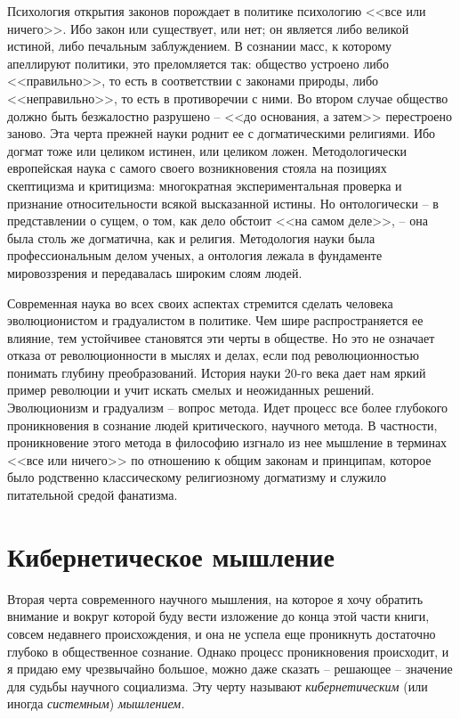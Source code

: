 \documentclass{book}
\begin{document}
Психология открытия законов порождает в политике психологию <<все или ничего>>. Ибо закон или существует, или нет; он является либо великой истиной, либо печальным заблуждением. В сознании масс, к которому апеллируют политики, это преломляется так: общество устроено либо <<правильно>>, то есть в соответствии с законами природы, либо <<неправильно>>, то есть в противоречии с ними. Во втором случае общество должно быть безжалостно разрушено -- <<до основания, а затем>> перестроено заново. Эта черта прежней науки роднит ее с догматическими религиями. Ибо догмат тоже или целиком истинен, или целиком ложен. Методологически европейская наука с самого своего возникновения стояла на позициях скептицизма и критицизма: многократная экспериментальная проверка и признание относительности всякой высказанной истины. Но онтологически -- в представлении о сущем, о том, как дело обстоит <<на самом деле>>, -- она была столь же догматична, как и религия. Методология науки была профессиональным делом ученых, а онтология лежала 
в 
фундаменте мировоззрения и пе­редавалась широким слоям людей.

Современная наука во всех своих аспектах стремится сделать человека эволюционистом и градуалистом в политике. Чем шире распространяется ее влияние, тем устойчивее становятся эти черты в обществе. Но это не означает отказа от революционности в мыслях и делах, если под революционностью понимать глубину преобразований. История науки 20-го века дает нам яркий пример революции и учит искать смелых и неожиданных решений. Эволюционизм и градуализм -- вопрос метода. Идет процесс все более глубокого проникновения в сознание людей критического, научного метода. В частности, проникновение этого метода в философию изгнало из нее мышление в терминах <<все или ничего>> по отношению к общим законам и принципам, которое было родственно классическому религиозному догматизму и служило питательной средой фанатизма.

\section{Кибернетическое мышление}

Вторая черта современного научного мышления, на которое я хочу обратить внимание и 
вокруг которой буду вести изло­жение до конца этой части книги, совсем недавнего 
происхождения, и она не успела еще проникнуть достаточно глубоко в общественное 
сознание. Однако процесс проникновения происходит, и я придаю ему чрезвычайно 
большое, можно даже сказать -- решающее -- значение для судьбы научного социа­лизма. 
Эту черту называют \textit{кибернетическим}  (или иногда \textit{системным}) 
\textit{мышлением.} 
\end{document}

